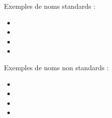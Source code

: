 \documentclass[11pt,a4paper]{article}
\begin{document}
\medskip

Exemples de noms standards :

\begin{itemize}
\item {}
\item {}
\item {}
\item {}
\end{itemize}

\medskip

Exemples de noms non standards :
\begin{itemize}
\item {}
\item {}
\item {}
\item {}
\end{itemize}
\end{document}

